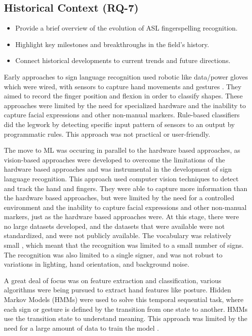 \subsection{Historical Context (RQ-7)}

\begin{itemize}
    \item Provide a brief overview of the evolution of ASL fingerspelling recognition.
    \item Highlight key milestones and breakthroughs in the field's history.
    \item Connect historical developments to current trends and future directions.
\end{itemize}
Early approaches to sign language recognition used robotic like data/power gloves which were wired, with sensors to capture hand movements and gestures \cite{saeedSystematicReviewSystemsBased2022}. They aimed to record the finger position and flexion in order to classify shapes. These approaches were limited by the need for specialized hardware and the inability to capture facial expressions and other non-manual markers. Rule-based classifiers did the legwork by detecting specific input pattern of sensors to an output by programmatic rules. This approach was not practical or user-friendly.

The move to ML was occuring in parallel to the hardware based approaches, as
vision-based approaches were developed to overcome the limitations of the hardware based approaches and was instrumental in the development of sign language recognition. This approach used computer vision techniques to detect and track the hand and fingers. They were able to capture more information than the hardware based approaches, but were limited by the need for a controlled environment and the inability to capture facial expressions and other non-manual markers, just as the hardware based approaches were. At this stage, there were no large datasets developed, and the datasets that were available were not standardized, and were not publicly available. The vocabulary was relatively small \cite{vonagrisRecentDevelopmentsVisual2008}, which meant that the recognition was limited to a small number of signs. The recognition was also limited to a single signer, and was not robust to variations in lighting, hand orientation, and background noise.

A great deal of focus was on feature extraction and classification, various algorithms were being pursued to extract hand features like posture. Hidden Markov Models (HMMs) were used to solve this temporal sequential task, where each sign or gesture is defined by the transition from one state to another. HMMs use the transition state to understand meaning. This approach was limited by the need for a large amount of data to train the model \cite{vonagrisRecentDevelopmentsVisual2008}.

